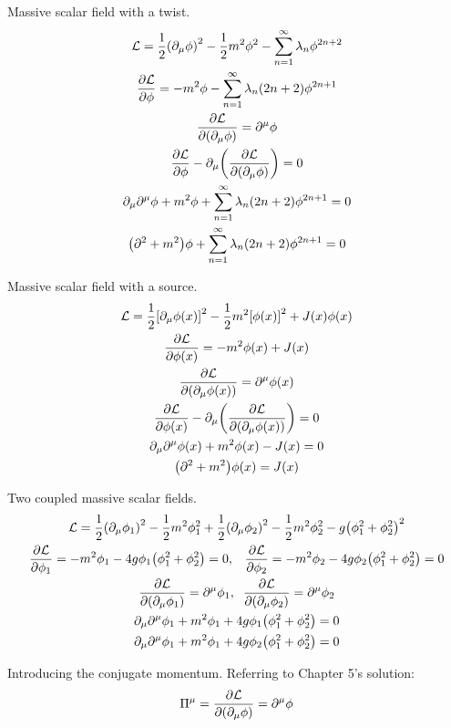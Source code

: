 \documentclass{report}
\begin{document}
\begin{subquests}
	\item Massive scalar field with a twist.
	\begin{gather*}
		\mathcal L = \frac{1}{2}\pqty{\partial_{\mu}\phi}^2 - \frac{1}{2}m^2\phi^2 - \sum_{n=1}^{\infty}\lambda_n \phi^{2n+2}\\
		\pdv{\mathcal L}{\phi} = -m^2\phi - \sum_{n=1}^{\infty}\lambda_n \pqty{2n+2}\phi^{2n+1} \\
		\pdv{\mathcal L}{\pqty{\partial_{\mu}\phi}} = \partial^{\mu}\phi \\
		\pdv{\mathcal L}{\phi}-\partial_{\mu}\pqty{\pdv{\mathcal L}{\pqty{\partial_{\mu}\phi}}} = 0 \\
		\partial_{\mu}\partial^{\mu}\phi + m^2\phi + \sum_{n=1}^{\infty}\lambda_n \pqty{2n+2}\phi^{2n+1} = 0 \\
		\pqty{\partial^2 + m^2}\phi + \sum_{n=1}^{\infty}\lambda_n \pqty{2n+2}\phi^{2n+1} = 0
	\end{gather*}

	\item Massive scalar field with a source.
	\begin{gather*}
		\mathcal L = \frac{1}{2}\bqty{\partial_{\mu}\phi(x)}^2 - \frac{1}{2}m^2\bqty{\phi(x)}^2 + J(x)\phi(x)\\
		\pdv{\mathcal L}{\phi(x)} = -m^2\phi(x) +J(x) \\
		\pdv{\mathcal L}{\pqty{\partial_{\mu}\phi(x)}} = \partial^{\mu}\phi(x) \\
		\pdv{\mathcal L}{\phi(x)}-\partial_{\mu}\pqty{\pdv{\mathcal L}{\pqty{\partial_{\mu}\phi(x)}}} = 0 \\
		\partial_{\mu}\partial^{\mu}\phi(x) + m^2\phi(x) - J(x) = 0 \\
		\pqty{\partial^2 + m^2}\phi(x) = J(x)
	\end{gather*}

	\item Two coupled massive scalar fields.
	\begin{gather*}
		\mathcal L = \frac{1}{2}\pqty{\partial_{\mu}\phi_1}^2 - \frac{1}{2}m^2\phi_1^2 + \frac{1}{2}\pqty{\partial_{\mu}\phi_2}^2 - \frac{1}{2}m^2\phi_2^2 - g\pqty{\phi_1^2 + \phi_2^2}^2 \\
		\pdv{\mathcal L}{\phi_1} = -m^2\phi_1 - 4g\phi_1\pqty{\phi_1^2 + \phi_2^2} = 0, \;\;\; \pdv{\mathcal L}{\phi_2} = -m^2\phi_2 - 4g\phi_2\pqty{\phi_1^2 + \phi_2^2} = 0 \\
		\pdv{\mathcal L}{\pqty{\partial_{\mu}\phi_1}} = \partial^{\mu}\phi_1, \;\; \pdv{\mathcal L}{\pqty{\partial_{\mu}\phi_2}} = \partial^{\mu}\phi_2 \\	
		\partial_{\mu}\partial^{\mu}\phi_1 + m^2\phi_1 + 4g\phi_1\pqty{\phi_1^2 + \phi_2^2} = 0 \\
		\partial_{\mu}\partial^{\mu}\phi_1 + m^2\phi_1 + 4g\phi_2\pqty{\phi_1^2 + \phi_2^2} = 0
	\end{gather*}
	\item Introducing the conjugate momentum. Referring to Chapter 5's solution:
	\begin{gather*}
		\Pi^{\mu} = \pdv{\mathcal L}{\pqty{\partial_{\mu}\phi}} = \partial^{\mu}\phi
	\end{gather*}
\end{subquests}
\end{document}
